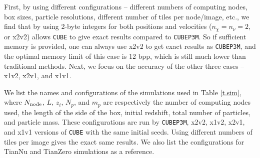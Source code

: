 \documentclass[10pt,twocolumn,reprint]{emulateapj}
\begin{document}
First, by using different configurations -- different numbers of computing nodes, box sizes, particle resolutions, different number of tiles per node/image, etc., we find that by using 2-byte integers for both positions and velocities ($n_\chi=n_\nu=2$, or x2v2) allows {\tt CUBE} to give exact results compared to {\tt CUBEP3M}. So if sufficient memory is provided, one can always use x2v2 to get exact results as {\tt CUBEP3M}, and the optimal memory limit of this case is 12 bpp, which is still much lower than traditional methods. Next, we focus on the accuracy of the other three cases -- x1v2, x2v1, and x1v1.

We list the names and configurations of the simulations used in Table \ref{t.sim}, where $N_{\rm node}$, $L$, $z_i$, $N_p$, and $m_p$ are respectively the number of computing nodes used, the length of the side of the box, initial redshift, total number of particles, and particle mass. These configurations are run by {\tt CUBEP3M}, x2v2, x1v2, x2v1, and x1v1 versions of {\tt CUBE} with the same initial seeds. Using different numbers of tiles per image gives the exact same results. We also list the configurations for TianNu and TianZero \citep{2017NatAs...1E.143Y,2017RAA....17...85E} simulations as a reference.
\end{document}
